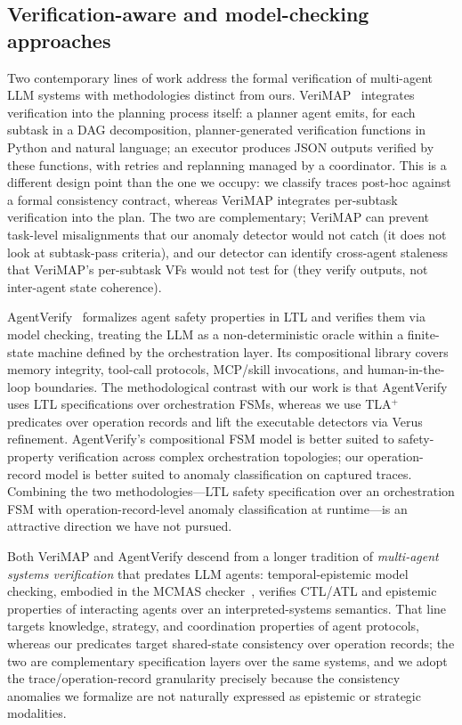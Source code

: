 \documentclass[journal,compsoc,10pt]{IEEEtran}
\providecommand{\citep}{\cite}
\theoremstyle{definition}
\theoremstyle{remark}
\begin{document}
\subsection{Verification-aware and model-checking approaches}
\label{sec:related-verification-aware}
Two contemporary lines of work address the formal verification
of multi-agent LLM systems with methodologies distinct from
ours. VeriMAP~\citep{Xu2025VeriMAP} integrates verification
into the planning process itself: a planner agent emits, for
each subtask in a DAG decomposition, planner-generated
verification functions in Python and natural language; an
executor produces JSON outputs verified by these functions,
with retries and replanning managed by a coordinator. This is
a different design point than the one we occupy: we classify
traces post-hoc against a formal consistency contract,
whereas VeriMAP integrates per-subtask verification into the
plan. The two are complementary; VeriMAP can prevent
task-level misalignments that our anomaly detector would not
catch (it does not look at subtask-pass criteria), and our
detector can identify cross-agent staleness that VeriMAP's
per-subtask VFs would not test for (they verify outputs, not
inter-agent state coherence).

AgentVerify~\citep{AgentVerify2026} formalizes agent safety
properties in LTL and verifies them via model checking,
treating the LLM as a non-deterministic oracle within a
finite-state machine defined by the orchestration layer. Its
compositional library covers memory integrity, tool-call
protocols, MCP/skill invocations, and
human-in-the-loop boundaries. The methodological contrast
with our work is that AgentVerify uses LTL specifications
over orchestration FSMs, whereas we use TLA$^+$ predicates
over operation records and lift the executable detectors via
Verus refinement. AgentVerify's compositional FSM model is
better suited to safety-property verification across complex
orchestration topologies; our operation-record model is
better suited to anomaly classification on captured traces.
Combining the two methodologies---LTL safety specification
over an orchestration FSM with operation-record-level
anomaly classification at runtime---is an attractive
direction we have not pursued.

\medskip
Both VeriMAP and AgentVerify descend from a longer tradition of
\emph{multi-agent systems verification} that predates LLM agents:
temporal-epistemic model checking, embodied in the MCMAS
checker~\citep{LomuscioQuRaimondi2017MCMAS}, verifies CTL/ATL and
epistemic properties of interacting agents over an interpreted-systems
semantics. That line targets knowledge, strategy, and coordination
properties of agent protocols, whereas our predicates target
shared-state consistency over operation records; the two are
complementary specification layers over the same systems, and we adopt
the trace/operation-record granularity precisely because the
consistency anomalies we formalize are not naturally expressed as
epistemic or strategic modalities.
\end{document}
